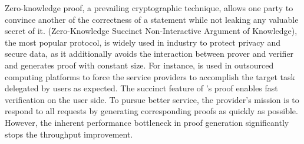 Zero-knowledge proof, a prevailing cryptographic technique, allows one party to convince another of the correctness of a statement while not leaking any valuable secret of it. \zk (Zero-Knowledge Succinct Non-Interactive Argument of Knowledge), the most popular protocol, is widely used in industry to protect privacy and secure data, as it additionally avoids the interaction between prover and verifier and generates proof with constant size. For instance, \zk  
is used in outsourced computing platforms to force the service providers to accomplish the target task delegated by users as expected. The succinct feature of \zk's proof enables fast verification on the user side. To pursue better service, the provider's mission is to respond to all requests by generating corresponding proofs as quickly as possible. However, the inherent performance bottleneck in proof generation significantly stops the throughput improvement. 










